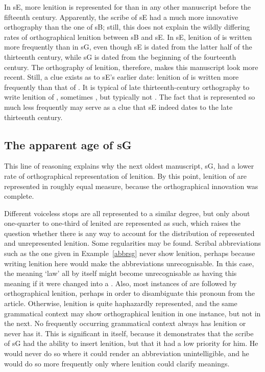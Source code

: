 In \gls{sE},  more lenition is represented for  than in any other manuscript before the fifteenth century. Apparently, the scribe of \gls{sE} had a much more innovative orthography than the one of \gls{sB}; still, this does not explain the wildly differing rates of orthographical lenition between \gls{sB} and \gls{sE}. In \gls{sE}, lenition of  is written more frequently than in \gls{sG}, even though \gls{sE} is dated from the latter half of the thirteenth century, while \gls{sG} is dated from the beginning of the fourteenth century. The orthography of lenition, therefore, makes this manuscript look more recent. Still, a clue exists as to \gls{sE}'s earlier date: lenition of  is written  more frequently than that of . It is typical of late thirteenth-century orthography to write lenition of , sometimes , but typically not . The fact that  is represented so much less frequently may serve as a clue that \gls{sE} indeed dates to the late thirteenth century.

\subsection{The apparent age of \gls{sG}}
\label{sec:apparent-age-glssg}

This line of reasoning explains why the next oldest manuscript, \gls{sG}, had a lower rate of orthographical representation of lenition. By this point, lenition of  are represented in roughly equal measure, because the orthographical innovation was complete. 

Different voiceless stops are all represented to a similar degree, but only about one-quarter to one-third of lenited  are represented as such, which raises the question whether there is any way to account for the distribution of represented and unrepresented lenition. Some regularities may be found. Scribal abbreviations such as the one given in Example~\ref{abbrsg} never show lenition, perhaps because writing lenition here would make the abbreviations unrecognisable.
In this case, the  meaning `law' all by itself might become unrecognisable as having this meaning if it were changed into a . Also, most instances of  are followed by orthographical lenition, perhaps in order to disambiguate this pronoun from the article.
Otherwise, lenition is quite haphazardly represented, and the same grammatical context may show orthographical lenition in one instance, but not in the next. No frequently occurring grammatical context always has lenition or never has it. This is significant in itself, because it demonstrates that the scribe of \gls{sG} had the ability to insert lenition, but that it had a low priority for him. He would never do so where it could render an abbreviation unintelligible, and he would do so more frequently only where lenition could clarify meanings.

